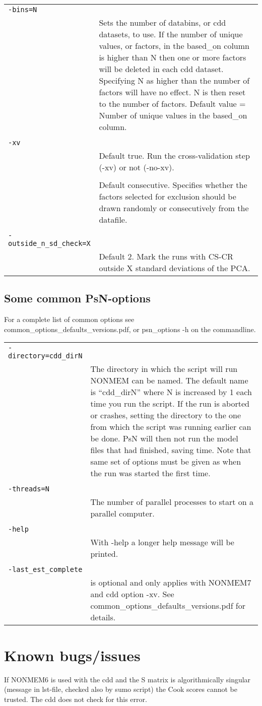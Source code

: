 \documentclass[a4paper,12pt]{article}
\begin{document}
\begin{longtable}{p{1in}p{4in}}
\verb|-bins=N| & \\
 & Sets the number of databins, or cdd datasets, to use. If the number of unique values, or factors, in the based\_on column is higher than N then one or more factors will be deleted in each cdd dataset. Specifying N as higher than the number of factors will have no effect. N is then reset to the number of factors. Default value = Number of unique values in the based\_on column. \\
\\
\verb|-xv| & \\
 & Default true. Run the cross-validation step (-xv) or not (-no-xv). \\
\\
\verb%-selection_method=<random | consecutive>% & \\
 & Default consecutive. Specifies whether the factors selected for exclusion should be drawn randomly or consecutively from the datafile. \\
\\
\verb|-outside_n_sd_check=X| & \\
 & Default 2. Mark the runs with CS-CR outside X standard deviations of the PCA. \\
\end{longtable}

\subsection{Some common PsN-options}

For a complete list of common options see common\_options\_defaults\_versions.pdf, or psn\_options -h on the commandline.

\begin{longtable}{p{1in}p{4in}}
\verb|-directory=cdd_dirN| & \\
\nopagebreak
 & The directory in which the script will run NONMEM can be named. The default name is “cdd\_dirN” where N is increased by 1 each time you run the script. If the run is aborted or crashes, setting the directory to the one from which the script was running earlier can be done. PsN will then not run the model files that had finished, saving time. Note that same set of options must be given as when the run was started the first time. \\
\\
\verb|-threads=N| & \\
 & The number of parallel processes to start on a parallel computer. \\
\\
\verb|-help| & \\
 & With -help a longer help message will be printed. \\
\\
\verb|-last_est_complete| & \\
 & is optional and only applies with NONMEM7 and cdd option -xv. See common\_options\_defaults\_versions.pdf for details.
\end{longtable}


\section{Known bugs/issues}

If NONMEM6 is used with the cdd and the S matrix is algorithmically singular (message in lst-file, checked also by sumo script) the Cook scores cannot  be trusted. The cdd does not check for this error. 
\end{document}
